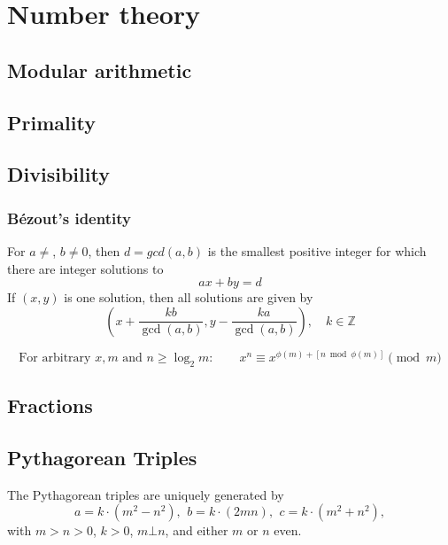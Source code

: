 \chapter{Number theory}

\section{Modular arithmetic}

\section{Primality}

\section{Divisibility}

	\subsection{Bézout's identity}
	For $a \neq $, $b \neq 0$, then $d=gcd(a,b)$ is the smallest positive integer for which there are integer solutions to
	$$ax+by=d$$
	If $(x,y)$ is one solution, then all solutions are given by
	$$\left(x+\frac{kb}{\gcd(a,b)}, y-\frac{ka}{\gcd(a,b)}\right), \quad k\in\mathbb{Z}$$

	\[
	\text{For arbitrary } x,m \text{ and } n \ge \log_2 m:\qquad
	x^n \equiv x^{\phi(m)+\left[n \bmod \phi(m)\right]} \pmod{m}
	\]

\section{Fractions}

\section{Pythagorean Triples}
 The Pythagorean triples are uniquely generated by
 \[ a=k\cdot (m^{2}-n^{2}),\ \,b=k\cdot (2mn),\ \,c=k\cdot (m^{2}+n^{2}), \]
 with $m > n > 0$, $k > 0$, $m \bot n$, and either $m$ or $n$ even.

